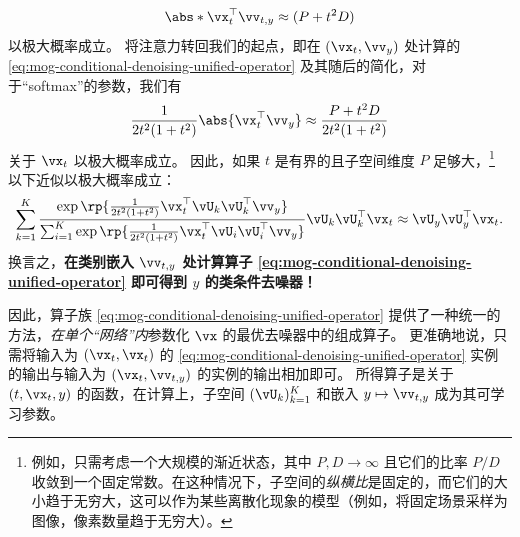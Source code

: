 \documentclass[../../book-main_zh.tex]{subfiles}
\begin{document}
\begin{example}
\begin{equation*}
        \abs*{\vx_t^\top \vv_{t,y}}
        \approx
        (P + t^2 D)
    \end{equation*}
    以极大概率成立。
    将注意力转回我们的起点，即在 $(\vx_t,
    \vv_y)$ 处计算的 \eqref{eq:mog-conditional-denoising-unified-operator} 及其随后的简化，对于“softmax”的参数，我们有
    \begin{equation*}
        {\frac{1}{2t^{2}(1 + t^{2})}\abs{\vx_t^\top \vv_y}}
        \approx
        \frac{P + t^2 D}{2t^{2}(1 + t^{2})}
    \end{equation*}
    关于 $\vx_t$ 以极大概率成立。
    因此，如果 $t$ 是有界的且子空间维度 $P$ 足够大，\footnote{例如，只需考虑一个大规模的渐近状态，其中 $P, D \to \infty$ 且它们的比率
        $P/D$ 收敛到一个固定常数。在这种情况下，子空间的\textit{纵横比}是固定的，而它们的大小趋于无穷大，这可以作为某些离散化现象的模型（例如，将固定场景采样为图像，像素数量趋于无穷大）。}
    以下近似以极大概率成立：
    \begin{equation}
        \sum_{k = 1}^{K}
        \frac{
            \exp\rp{\frac{1}{2t^{2}(1
            + t^{2})}\vx_t^\top \vU_k \vU_k^\top \vv_y}
        }
        {
            \sum_{i
            = 1}^{K}\exp\rp{\frac{1}{2t^{2}(1
            + t^{2})}\vx_t^\top \vU_i \vU_i^\top \vv_y}
        }
        \vU_{k}\vU_{k}^{\top}\vx_t
        \approx
        \vU_{y}\vU_{y}^{\top}\vx_t.
    \end{equation}
    换言之，\textbf{在类别嵌入 $\vv_{t, y}$ 处计算算子
        \eqref{eq:mog-conditional-denoising-unified-operator} 即可得到 $y$ 的类条件去噪器！}

    因此，算子族
    \eqref{eq:mog-conditional-denoising-unified-operator}
    提供了一种统一的方法，\textit{在单个“网络”内}参数化 $\vx$ 的最优去噪器中的组成算子。
    更准确地说，只需将输入为 $(\vx_t,
    \vx_t)$ 的 \eqref{eq:mog-conditional-denoising-unified-operator} 实例的输出与输入为 $(\vx_t, \vv_{t, y})$ 的实例的输出相加即可。
    所得算子是关于 $(t, \vx_t, y)$ 的函数，在计算上，子空间
    $(\vU_k)_{k=1}^K$ 和嵌入 $y \mapsto \vv_{t, y}$ 成为其可学习参数。
\end{example}
\end{document}
